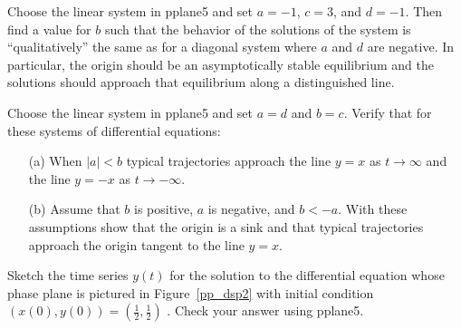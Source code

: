 \documentclass{ximera}
\begin{document}
\begin{exercise} \label{c3.5.2}
Choose the {\sf linear system} in {\sf pplane5} and set
$a=-1$, $c=3$, and $d=-1$.
Then find a value for $b$ such that the behavior of the
solutions of the system is ``qualitatively'' the same as for a
diagonal system where $a$ and $d$ are negative.  In particular,
the origin should be an asymptotically stable equilibrium and
the solutions should approach that equilibrium along a
distinguished line.
\end{exercise}

\begin{exercise} \label{c3.5.3}
Choose the {\sf linear system} in {\sf pplane5} and set
$a=d$ and $b=c$.  Verify that for these systems of differential
equations:
\begin{itemize}
\item[(a)]  When $|a|<b$ typical trajectories approach the line
$y=x$ as $t\to\infty$ and the line $y=-x$ as $t\to -\infty$.
\item[(b)]  Assume that $b$ is positive, $a$ is negative, and $b<-a$. 
With these assumptions show that the origin is a sink and that typical 
trajectories approach the origin tangent to the line $y=x$.
\end{itemize}
\end{exercise}

\TEXER

\begin{exercise} \label{c3.5.4}
Sketch the time series $y(t)$ for the solution to the
differential equation whose phase plane is pictured in
Figure~\ref{pp_dsp2} with initial condition
$(x(0),y(0))=(\frac{1}{2},\frac{1}{2})$ .  Check your answer
using {\sf pplane5}.
\end{exercise}
\end{document}
